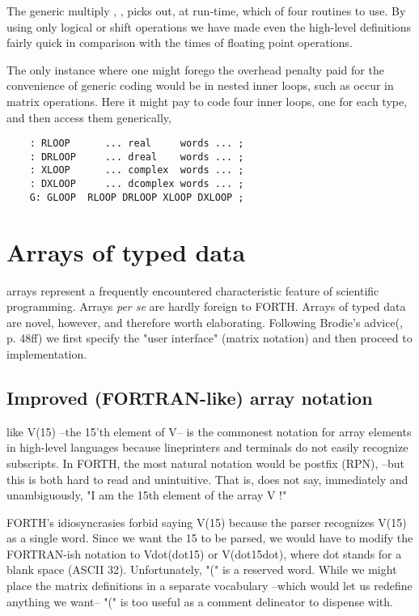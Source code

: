 The generic multiply , \eg, picks out, at run-time, which of four routines to use. By using only logical or shift operations we have made even the high-level definitions fairly quick in comparison with the times of floating point operations.

The only instance where one might forego the overhead penalty paid for the convenience of generic coding would be in nested inner loops, such as occur in matrix operations. Here it might pay to code four inner loops, one for each type, and then access them generically, \eg

\begin{lstlisting}
    : RLOOP      ... real     words ... ;
    : DRLOOP     ... dreal    words ... ;
    : XLOOP      ... complex  words ... ;
    : DXLOOP     ... dcomplex words ... ;
    G: GLOOP  RLOOP DRLOOP XLOOP DXLOOP ;
\end{lstlisting}

\section{Arrays of typed data}

 arrays represent a frequently encountered characteristic feature of scientific programming. Arrays \textit{per se} are hardly foreign to FORTH. Arrays of typed data are novel, however, and therefore worth elaborating. Following Brodie's advice(\TF, p. 48ff) we first specify the "user interface" (matrix notation) and then proceed to implementation.

\subsection{Improved (FORTRAN-like) array notation}
 like V(15) --the 15'th element of V-- is the commonest notation for array elements in high-level languages because lineprinters and terminals do not easily recognize subscripts. In FORTH, the most natural notation would be postfix (RPN),  --but this is both hard to read and unintuitive. That is,  does not say, immediately and unambiguously, "I am the 15th element of the array V !"

FORTH's idiosyncrasies forbid saying V(15) because the parser recognizes V(15) as a single word. Since we want the 15 to be parsed, we would have to modify the FORTRAN-ish notation to Vdot(dot15) or V(dot15dot), where dot stands for a blank space (ASCII 32). Unfortunately, "(" is a reserved word. While we might place the matrix definitions in a separate vocabulary --which would let us redefine anything we want-- "(" is too useful as a comment delineator to dispense with.

